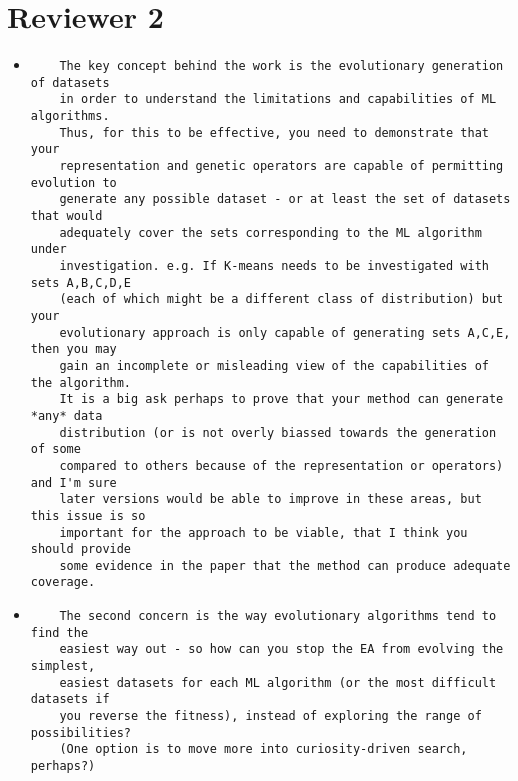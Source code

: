 \documentclass[11pt]{article}
\begin{document}
\section*{Reviewer 2}

\begin{itemize}

\item
\begin{verbatim}
    The key concept behind the work is the evolutionary generation of datasets
    in order to understand the limitations and capabilities of ML algorithms.
    Thus, for this to be effective, you need to demonstrate that your
    representation and genetic operators are capable of permitting evolution to
    generate any possible dataset - or at least the set of datasets that would
    adequately cover the sets corresponding to the ML algorithm under
    investigation. e.g. If K-means needs to be investigated with sets A,B,C,D,E
    (each of which might be a different class of distribution) but your
    evolutionary approach is only capable of generating sets A,C,E, then you may
    gain an incomplete or misleading view of the capabilities of the algorithm.
    It is a big ask perhaps to prove that your method can generate *any* data
    distribution (or is not overly biassed towards the generation of some
    compared to others because of the representation or operators) and I'm sure
    later versions would be able to improve in these areas, but this issue is so
    important for the approach to be viable, that I think you should provide
    some evidence in the paper that the method can produce adequate coverage.
\end{verbatim}


\item
\begin{verbatim}
    The second concern is the way evolutionary algorithms tend to find the
    easiest way out - so how can you stop the EA from evolving the simplest,
    easiest datasets for each ML algorithm (or the most difficult datasets if
    you reverse the fitness), instead of exploring the range of possibilities?
    (One option is to move more into curiosity-driven search, perhaps?)
\end{verbatim}


\end{itemize}
\end{document}
